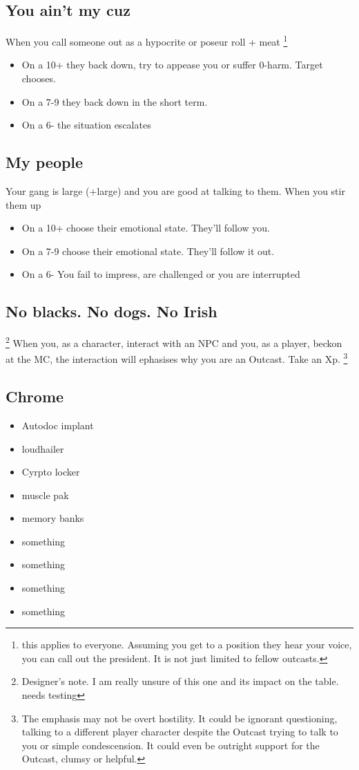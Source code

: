 \documentclass{tufte-book}
\begin{document}
\subsection{You ain't my cuz}
When you call someone out as a hypocrite or poseur {roll + meat} \footnote{this applies to everyone. Assuming you get to a position they hear your voice, you can call out the president. It is not just limited to fellow outcasts.}
\begin{itemize}
\item On a 10+ they back down, try to appease you or suffer 0-harm. Target chooses.
\item On a 7-9 they back down in the short term.
\item On a 6- the situation escalates
\end{itemize}

\subsection{My people}
Your gang is large (+large) and you are good at talking to them. When you stir them up 
\begin{itemize}
\item On a 10+ choose their emotional state. They'll follow you.
\item On a 7-9 choose their emotional state. They'll follow it out.
\item On a 6- You fail to impress, are challenged or you are interrupted
\end{itemize}

\subsection{No blacks. No dogs. No Irish}\footnote{Designer's note. I am really unsure of this one and its impact on the table. needs testing} 
When you, as a character, interact with an NPC and you, as a player, beckon at the MC, the interaction will ephasises why you are an Outcast. Take an Xp. 
\footnote {The emphasis may not be overt hostility. It could be ignorant questioning, talking to a different player character despite the Outcast trying to talk to you or simple condescension. It could even be outright support for the Outcast, clumsy or helpful.}

\subsection{Chrome}
\begin{multicols}{3}
\begin{itemize}
\item Autodoc implant
\item loudhailer
\item Cyrpto locker
\item muscle pak
\item memory banks
\item something
\item something
\item something
\item something
\end{itemize}
\end{multicols}
\end{document}
